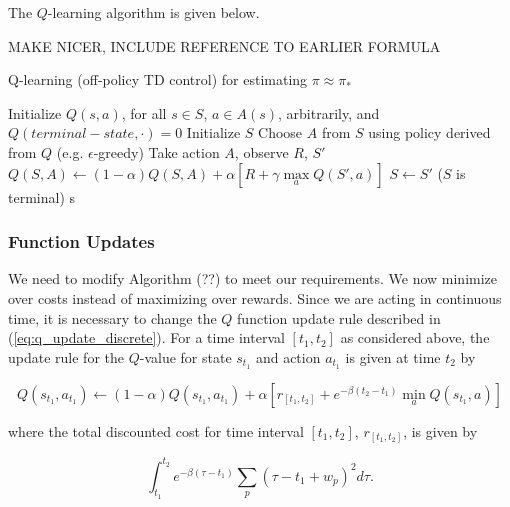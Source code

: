 The $Q$-learning algorithm is given below.

{\color{red} MAKE NICER, INCLUDE REFERENCE TO EARLIER FORMULA}
\begin{center}
    \begin{minipage}{12cm}
    \begin{algorithm}[H]
    \caption{Q-learning (off-policy TD control) for estimating $\pi \approx \pi_*$}
    \begin{algorithmic}[1]
    
    \STATE Initialize $Q(s, a)$, for all $s \in S$, $a \in A(s)$, arbitrarily, and $Q(terminal-state, \cdot) = 0$
    \REPEAT
    \STATE Initialize $S$
    \REPEAT
    \STATE Choose $A$ from $S$ using policy derived from $Q$ (e.g. $\epsilon$-greedy)
    \STATE Take action $A$, observe $R$, $S'$
    \STATE $Q(S, A) \leftarrow (1 - \alpha) Q(S, A) + \alpha \left[R + \gamma \max\limits_a Q(S', a) \right]$
    \STATE $S \leftarrow S'$
    \UNTIL ($S$ is terminal)
    s
    \end{algorithmic}
    \end{algorithm}
    \end{minipage}
\end{center}

\subsubsection{Function Updates}
We need to modify Algorithm (??) to meet our requirements. We now minimize over costs instead of maximizing over rewards. Since we are acting in continuous time, it is necessary to change the $Q$ function update rule described in (\ref{eq:q_update_discrete}). For a time interval $[t_1, t_2]$ as considered above, the update rule for the $Q$-value for state $s_{t_1}$ and action $a_{t_1}$ is given at time $t_2$ by

\begin{equation}
    Q(s_{t_1}, a_{t_1}) \leftarrow     
    (1 - \alpha) Q(s_{t_1}, a_{t_1}) + \alpha \left[r_{[t_1,t_2]} + e^{-\beta(t_2 - t_1)} \min\limits_a Q(s_{t_1}, a) \right] \label{eq:q_update_continuous}
\end{equation}

where the total discounted cost for time interval $[t_1, t_2]$, $r_{[t_1, t_2]}$, is given by

\begin{equation}
    \int_{t_1}^{t_2} e^{-\beta(\tau - t_1)} \sum_p(\tau - t_1 + w_p)^2 d\tau. \label{eq:cost_reinforcement_int}
\end{equation}

